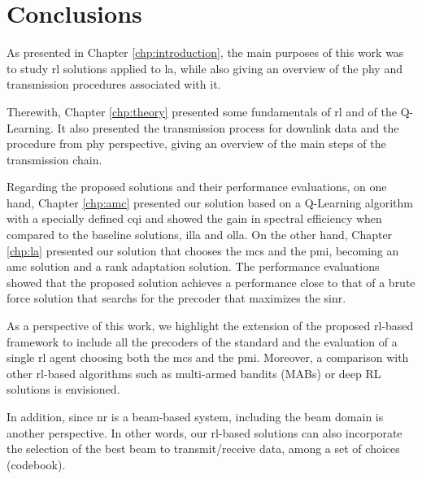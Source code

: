 \glsresetall
%

\chapter{Conclusions}%
\label{chp:conclusion}

As presented in Chapter \ref{chp:introduction}, the main purposes of this work was to study \gls{rl} solutions applied to \gls{la}, while also giving an overview of the \gls{phy} and transmission procedures associated with it.

Therewith, Chapter \ref{chp:theory} presented some fundamentals of \gls{rl} and of the Q-Learning.
%
It also presented the transmission process for downlink data and the procedure from \gls{phy} perspective, giving an overview of the main steps of the transmission chain.

Regarding the proposed solutions and their performance evaluations, on one hand, Chapter \ref{chp:amc} presented our solution based on a Q-Learning algorithm with a specially defined \gls{cqi} and showed the gain in spectral efficiency when compared to the baseline solutions, \gls{illa} and \gls{olla}.
%
On the other hand, Chapter \ref{chp:la} presented our solution that chooses the \gls{mcs} and the \gls{pmi}, becoming an \gls{amc} solution and a rank adaptation solution. The performance evaluations showed that the proposed solution achieves a performance close to that of a brute force solution that searchs for the precoder that maximizes the \gls{sinr}.

As a perspective of this work, we highlight the extension of the proposed \gls{rl}-based framework to include all the precoders of the standard \cite{3gpp.38.214} and the evaluation of a single \gls{rl} agent choosing both the \gls{mcs} and the \gls{pmi}.
%
Moreover, a comparison with other \gls{rl}-based algorithms such as multi-armed bandits (MABs) \cite{zhou2015survey} or deep RL solutions \cite{DeepRLSurvey} is envisioned.

In addition, since \gls{nr} is a beam-based system, including the beam domain is another perspective.
%
In other words, our \gls{rl}-based solutions can also incorporate the selection of the best beam to transmit/receive data, among a set of choices (codebook).
